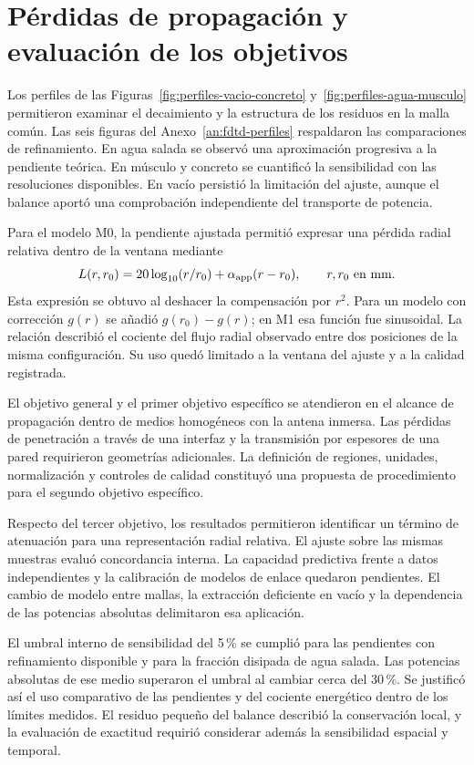 \section{Pérdidas de propagación y evaluación de los objetivos}
Los perfiles de las Figuras~\ref{fig:perfiles-vacio-concreto} y~\ref{fig:perfiles-agua-musculo} permitieron examinar el decaimiento y la estructura de los residuos en la malla común. Las seis figuras del Anexo~\ref{an:fdtd-perfiles} respaldaron las comparaciones de refinamiento. En agua salada se observó una aproximación progresiva a la pendiente teórica. En músculo y concreto se cuantificó la sensibilidad con las resoluciones disponibles. En vacío persistió la limitación del ajuste, aunque el balance aportó una comprobación independiente del transporte de potencia.

Para el modelo M0, la pendiente ajustada permitió expresar una pérdida radial relativa dentro de la ventana mediante
\begin{equation}
 L(r,r_0)=20\log_{10}(r/r_0)+\alpha_{\rm app}(r-r_0),\qquad r,r_0\text{ en mm}.
\label{eq:perdida-relativa-modelo}
\end{equation}
Esta expresión se obtuvo al deshacer la compensación por $r^2$. Para un modelo con corrección $g(r)$ se añadió $g(r_0)-g(r)$; en M1 esa función fue sinusoidal. La relación describió el cociente del flujo radial observado entre dos posiciones de la misma configuración. Su uso quedó limitado a la ventana del ajuste y a la calidad registrada.

El objetivo general y el primer objetivo específico se atendieron en el alcance de propagación dentro de medios homogéneos con la antena inmersa. Las pérdidas de penetración a través de una interfaz y la transmisión por espesores de una pared requirieron geometrías adicionales. La definición de regiones, unidades, normalización y controles de calidad constituyó una propuesta de procedimiento para el segundo objetivo específico.

Respecto del tercer objetivo, los resultados permitieron identificar un término de atenuación para una representación radial relativa. El ajuste sobre las mismas muestras evaluó concordancia interna. La capacidad predictiva frente a datos independientes y la calibración de modelos de enlace quedaron pendientes. El cambio de modelo entre mallas, la extracción deficiente en vacío y la dependencia de las potencias absolutas delimitaron esa aplicación.

El umbral interno de sensibilidad del 5\,\% se cumplió para las pendientes con refinamiento disponible y para la fracción disipada de agua salada. Las potencias absolutas de ese medio superaron el umbral al cambiar cerca del 30\,\%. Se justificó así el uso comparativo de las pendientes y del cociente energético dentro de los límites medidos. El residuo pequeño del balance describió la conservación local, y la evaluación de exactitud requirió considerar además la sensibilidad espacial y temporal.
